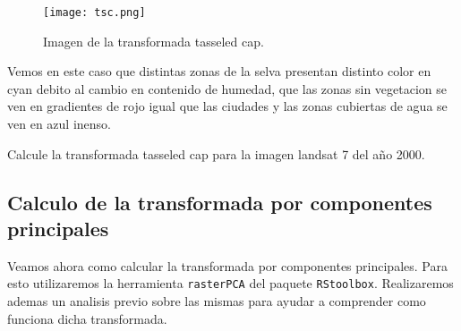 \begin{exa}
    \begin{figure}[h!]
    \begin{center}
        \texttt{[image: tsc.png]}
    \end{center}
    \caption{Imagen de la transformada tasseled cap.}
    \label{fig:tsc}
    \end{figure}
    Vemos en este caso que distintas zonas de la selva presentan distinto color
    en cyan debito al cambio en contenido de humedad, que las zonas sin
    vegetacion se ven en gradientes de rojo igual que las ciudades y las zonas
    cubiertas de agua se ven en azul inenso.
\end{exa}

\begin{act}
    Calcule la transformada tasseled cap para la imagen landsat 7 del año 2000.
\end{act}

\subsection{Calculo de la transformada por componentes principales}

Veamos ahora como calcular la transformada por componentes principales. Para
esto utilizaremos la herramienta \texttt{rasterPCA} del paquete
\texttt{RStoolbox}. Realizaremos ademas un analisis previo sobre las mismas para
ayudar a comprender como funciona dicha transformada.

